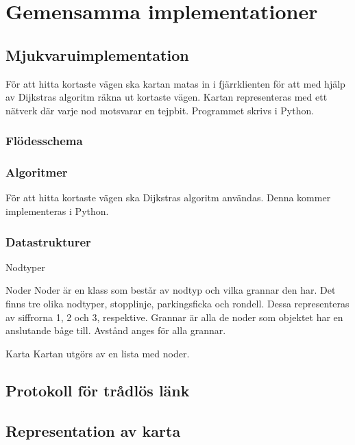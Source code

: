 \documentclass[designspec/spec.tex]{subfiles}
\begin{document}
\section{Gemensamma implementationer}

\subsection{Mjukvaruimplementation}
För att hitta kortaste vägen ska kartan matas in i fjärrklienten för att med
hjälp av Dijkstras algoritm räkna ut kortaste vägen. Kartan
representeras med ett nätverk där varje nod motsvarar en tejpbit. Programmet
skrivs i Python.

\subsubsection{Flödesschema}

\subsubsection{Algoritmer}
För att hitta kortaste vägen ska Dijkstras algoritm användas. Denna kommer
implementeras i Python.

\subsubsection{Datastrukturer}

\begin{labeling}{Nodtyper}

\item [Noder] 
Noder är en klass som består av nodtyp och vilka grannar den har.
Det finns tre olika nodtyper, stopplinje, parkingsficka och rondell. Dessa
representeras av siffrorna 1, 2 och 3, respektive.
Grannar är alla de noder som objektet har en anslutande båge till. Avstånd
anges för alla grannar.

\item[Karta]
Kartan utgörs av en lista med noder. 

\end{labeling}


\subsection{Protokoll för trådlös länk}

\subsection{Representation av karta}
\end{document}
